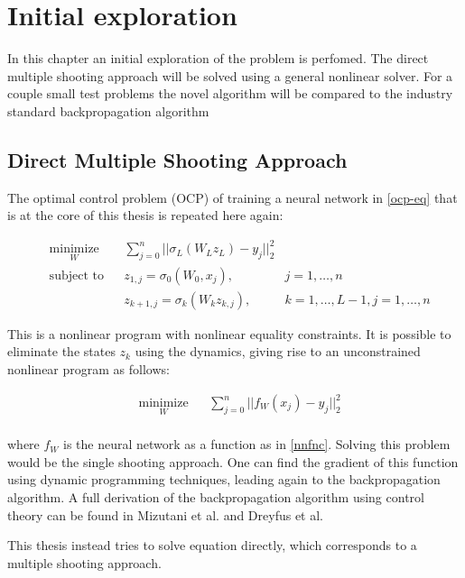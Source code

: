 \chapter{Initial exploration}
\label{cha:1}
In this chapter an initial exploration of the problem is perfomed. The direct multiple shooting approach will be solved using a general nonlinear solver. For a couple small test problems the novel algorithm will be compared to the industry standard backpropagation algorithm

\section{Direct Multiple Shooting Approach}
The optimal control problem (OCP) of training a neural network in \ref{ocp-eq} that is at the core of this thesis is repeated here again:

\begin{equation}
	\begin{aligned}
	& \underset{W}{\text{minimize}}
	& & \sum\limits_{j=0}^{n}||\sigma_L(W_Lz_L) - y_j||^2_2 \\
	& \text{subject to}
	& & z_{1,j} = \sigma_0(W_0,x_j), &j = 1,\ldots,n \\
	& & & z_{k+1,j} = \sigma_k(W_kz_{k,j}), &k = 1,\ldots,L-1,j = 1,\ldots,n
	\end{aligned}
	\label{ocp-eq2}
\end{equation}

This is a nonlinear program with nonlinear equality constraints. It is possible to eliminate the states $z_k$ using the dynamics, giving rise to an unconstrained nonlinear program as follows:

\begin{equation}
	\begin{aligned}
	& \underset{W}{\text{minimize}}
	& & \sum\limits_{j=0}^{n}||f_W(x_j) - y_j||^2_2 \\
	\end{aligned}
\end{equation}

where $f_W$ is the neural network as a function as in \ref{nnfnc}. Solving this problem would be the single shooting approach. One can find the gradient of this function using dynamic programming techniques, leading again to the backpropagation algorithm. A full derivation of the backpropagation algorithm using control theory can be found in Mizutani et al. \cite{mizutani2000} and Dreyfus et al. \cite{dreyfus1990}

This thesis instead tries to solve equation \label{ocp-eq2} directly, which corresponds to a multiple shooting approach.

